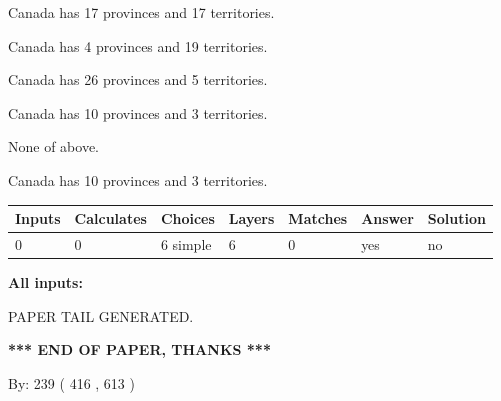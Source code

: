 \documentclass[12pt]{article}
\begin{document}
 
Canada has  17 provinces and  17 territories.
 
 
Canada has   4 provinces and  19 territories.
 
 
Canada has  26 provinces and  5 territories.
 
 
Canada has 10  provinces and 3 territories.
 
 
 None of above.
 
 
\noindent{}
 
 
Canada has 10  provinces and 3 territories.
 
 
\noindent{}
 
 
   
   
   
   
\noindent\begin{tabular}{|l|l|l|l|l|l|l|}
 \hline
Inputs & Calculates & Choices & Layers & Matches & Answer & Solution \\ \hline
 0  & 
 0  & 
 6
  simple  
  & 
 6  & 
 0  & 
  yes & 
  no 
  \\ \hline
 \end{tabular}
   
   
   
   
\noindent{}
   
   
   
   
\noindent\vspace{0.1in}\hspace{-0.08in} {\textbf{\Large{All inputs: }}}
   
   
   
   
   
   
 \vspace{0.2in}
 
   
   
\vspace{2.0in} PAPER TAIL GENERATED.
   
   
   
   
\vspace{1.0in} 
{\textbf{\large{ *** END OF PAPER, THANKS *** }}} 
   
   
\hspace{1.0in} By: 
 239 ( 416 ,  613 )
   
\end{document}
